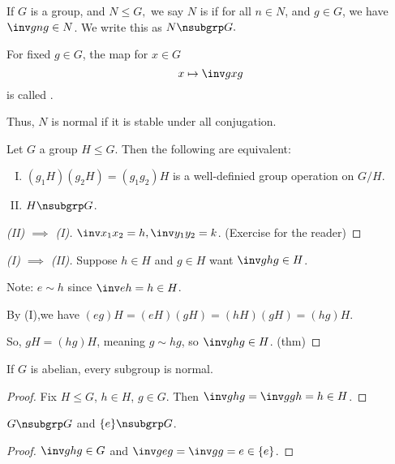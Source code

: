 \documentclass[notes.tex]{subfiles}
\begin{document}
\begin{defn}
	If $G$ is a group, and $N\le G,$ we say $N$ is  if for all $n\in N$, and $g\in G$, we have $\inv gng\in N$. We write this as $N\nsubgrp G.$ 
\end{defn}
\begin{remark}
	For fixed $g\in G$, the map for $x\in G$ \[
		x\mapsto \inv gxg
	\]
	is called .
\end{remark}

Thus, $N$ is normal if it is stable under all conjugation.

\begin{theorem}
	Let $G$ a group $H\le G$. Then the following are equivalent:
	
	\begin{enumerate}[(I)]
		\item $(g_1H)(g_2H) = (g_1g_2)H$ is a well-definied group operation on $G/H$.
		\item $H\nsubgrp G$.
	\end{enumerate}
	\begin{proof}[(II) $\implies$ (I)]
		$\inv x_1x_2=h, \inv y_1y_2=k$. (Exercise for the reader) %
 	\end{proof}
	\begin{proof}[(I) $\implies$ (II)]
		Suppose $h\in H$ and $g\in H$
		want $\inv ghg\in H$.

		Note: $e\sim h$ since $\inv eh=h\in H$.

		By (I),we have $ (eg)H =(eH)(gH) = (hH)(gH) = (hg)H$.

		So, $gH = (hg)H$, meaning $g\sim hg$, so $\inv ghg\in H$. \qedhere(thm)
	\end{proof}
\end{theorem}

\begin{proposition}
	If $G$ is abelian, every subgroup is normal.
\end{proposition}

\begin{proof}
	Fix $H\le G$, $h\in H$, $g\in G.$
	Then $\inv ghg = \inv ggh =h\in H$.
\end{proof}

\begin{proposition}
	$G\nsubgrp G$ and $\{e\}\nsubgrp G$.
\end{proposition}
\begin{proof}
	$\inv ghg \in G$ and $\inv geg = \inv gg = e\in \{e\}$.
\end{proof}
\end{document}
